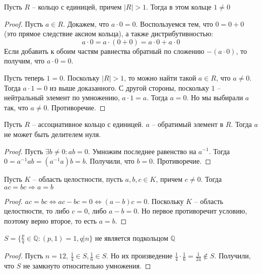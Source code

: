 \documentclass{article}
\begin{document}
\begin{statement}
    Пусть $R$ -- кольцо с единицей, причем $|R| > 1$. Тогда в этом кольце $1 \neq 0$
\end{statement}

\begin{proof}
    Пусть $a \in R$. Докажем, что $a \cdot 0 = 0$. Воспользуемся тем, что $0 = 0 + 0$ (это прямое следствие аксиом
    кольца), а также
    дистрибутивностью:
    \[
        a \cdot 0 = a \cdot (0 + 0) = a \cdot 0 + a \cdot 0
    \]
    Если добавить к обоим частям равнества обратный по сложению $-(a \cdot 0)$, то получим, что $a \cdot 0 = 0$.

    Пусть теперь $1 = 0$. Поскольку $|R| > 1$, то можно найти такой $a \in R$, что $a \neq 0$. Тогда $a \cdot 1 = 0$ из
    выше доказанного. С другой стороны, поскольку $1$ -- нейтральный элемент по умножению, $a \cdot 1 = a$. Тогда $a =
    0$. Но мы выбирали $a$ так, что $a \neq 0$. Противоречие.
\end{proof}

\begin{statement}
    Пусть $R$ -- ассоциативное кольцо с единицей. $a$ -- обратимый элемент в $R$. Тогда $a$ не может быть делителем нуля.
\end{statement}

\begin{proof}
    Пусть $\exists b \neq 0: ab = 0$. Умножим последнее равенство на $a^{-1}$. Тогда $0 = a^{-1} ab = (a^{-1}a)b = b$.
    Получили, что $b = 0$. Противоречие.
\end{proof}

\begin{statement}
    Пусть $K$ -- область целостности, пусть $a, b, c \in K$, причем $c \neq 0$. Тогда $ac = bc \Rightarrow a = b$
\end{statement}

\begin{proof}
    $ac = bc \Leftrightarrow ac - bc = 0 \Leftrightarrow (a - b)c = 0$. Поскольку $K$ -- область целостности, то либо $c
    = 0$, либо $a - b = 0$. Но первое противоречит условию, поэтому верно второе, то есть $a = b$.
\end{proof}

\begin{statement}
    $S = \{\frac{p}{q} \in \mathbb{Q}: (p, 1) = 1, q | n\}$ не является подкольцом $\mathbb{Q}$
\end{statement}

\begin{proof}
    Пусть $n = 12$, $\frac{1}{4} \in S, \frac{1}{6} \in S$. Но их произведение $\frac{1}{4} \cdot \frac{1}{6} =
    \frac{1}{24} \not \in S$. Получили, что $S$ не замкнуто относительно умножения.
\end{proof}
\end{document}
